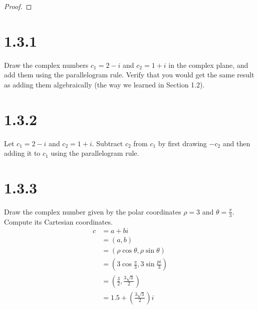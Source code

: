 \documentclass[11pt]{article}
\begin{document}
\begin{proof}
%

\end{proof}



\section{1.3.1}
Draw the complex numbers $c_1 = 2 - i$ and $c_2 = 1 + i$ in the complex plane, and add them using the parallelogram rule. 
Verify that you would get the same result as adding them algebraically (the way we learned in Section 1.2).


\section{1.3.2}
Let $c_1 = 2 - i$ and $c_2 = 1 + i$. Subtract $c_2$ from $c_1$ by first drawing $-c_2$ and then adding it to $c_1$ using the parallelogram rule.



\section{1.3.3}
Draw the complex number given by the polar coordinates $\rho = 3$ and $\theta = \frac{\pi}{3}$. 
Compute its Cartesian coordinates.
\begin{align*}
	c &= a + bi  \\
	  &= (a,b)  \\
	  &= (\rho \cos \theta , \rho \sin \theta)  \\
	  &= (3\cos \frac{\pi}{3}, 3\sin \frac{pi}{3})  \\
	  &= (\frac{3}{2} ,\frac{3\sqrt{3}}{2})  \\
	  &= 1.5 + (\frac{3\sqrt{3}}{2})i
\end{align*}
\end{document}
